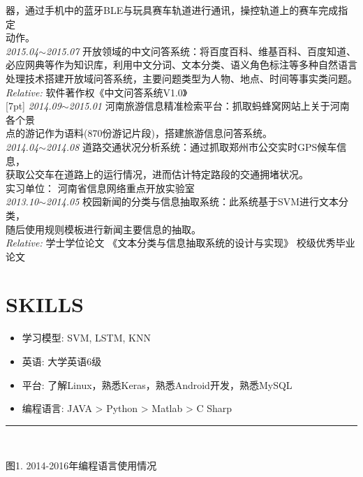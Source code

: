 \documentclass[line, margin]{res}
\newcommand{\xiaowu}{\fontsize{9pt}{15.75pt}\selectfont} %
\begin{document}
\begin{resume}
{{ 器，通过手机中的蓝牙BLE与玩具赛车轨道进行通讯，操控轨道上的赛车完成指定\\
 动作。}\\
[7pt]
 {\sl 2015.04$\sim$2015.07} 开放领域的中文问答系统：{ 将百度百科、维基百科、百度知道、\\
 必应网典等作为知识库，利用中文分词、文本分类、语义角色标注等多种自然语言\\
 处理技术搭建开放域问答系统，主要问题类型为人物、地点、时间等事实类问题。}\\ 
 {\sl\xiaowu Relative:} {\xiaowu 软件著作权《中文问答系统V1.0》} \\
[7pt]
 {\sl 2014.09$\sim$2015.01} 河南旅游信息精准检索平台：{ 抓取蚂蜂窝网站上关于河南各个景\\
 点的游记作为语料(870份游记片段)，搭建旅游信息问答系统。} \\
[7pt]
 {\sl 2014.04$\sim$2014.08} 道路交通状况分析系统：{ 通过抓取郑州市公交实时GPS候车信息，\\
 获取公交车在道路上的运行情况，进而估计特定路段的交通拥堵状况。 \\
 {\xiaowu 实习单位： 河南省信息网络重点开放实验室} }\\
[7pt]
 {\sl 2013.10$\sim$2014.05} 校园新闻的分类与信息抽取系统：{ 此系统基于SVM进行文本分类，\\
 随后使用规则模板进行新闻主要信息的抽取。}\\
   {\sl\xiaowu Relative:} {\xiaowu 学士学位论文 《文本分类与信息抽取系统的设计与实现》 校级优秀毕业论文}} \\
 
\section{SKILLS}
\begin{itemize}
\item { 学习模型: }SVM, LSTM, KNN
\item { 英语: 大学英语6级}
\item { 平台: 了解Linux，熟悉Keras，熟悉Android开发，熟悉MySQL}
\item { 编程语言: }JAVA > Python > Matlab > C Sharp
\end{itemize}

\rule{13.0cm}{0.05em} \\
\begin{center}
{\xiaowu 图1. 2014-2016年编程语言使用情况}
\end{center}


\end{resume}
\end{document}
